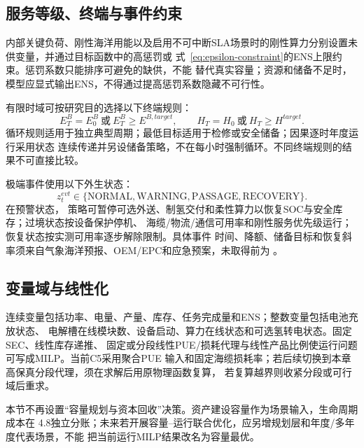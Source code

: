 \subsection{服务等级、终端与事件约束}

内部关键负荷、刚性海洋用能以及启用不可中断SLA场景时的刚性算力分别设置未供变量，并通过目标函数中的高惩罚或
式~\eqref{eq:epsilon-constraint}的ENS上限约束。惩罚系数只能排序可避免的缺供，不能
替代真实容量；资源和储备不足时，模型应显式输出ENS，不得通过提高惩罚系数隐藏不可行性。

有限时域可按研究目的选择以下终端规则：
\begin{equation}
E_T^B=E_0^B\ \text{或}\ E_T^B\ge E^{B,target},\qquad
H_T=H_0\ \text{或}\ H_T\ge H^{target}.
\label{eq:terminal-rules}
\end{equation}
循环规则适用于独立典型周期；最低目标适用于检修或安全储备；因果逐时年度运行采用状态
连续传递并另设储备策略，不在每小时强制循环。不同终端规则的结果不可直接比较。

极端事件使用以下外生状态：
\begin{equation}
z_t^{evt}\in\{\mathrm{NORMAL},\mathrm{WARNING},
\mathrm{PASSAGE},\mathrm{RECOVERY}\}.
\label{eq:event-state}
\end{equation}
在预警状态，
策略可暂停可选外送、制氢交付和柔性算力以恢复SOC与安全库存；过境状态按设备保护停机、
海缆/物流/通信可用率和刚性服务优先级运行；恢复状态按实测可用率逐步解除限制。具体事件
时间、降额、储备目标和恢复斜率须来自气象海洋预报、OEM/EPC和应急预案，未取得前为
\assumptiontag。

\subsection{变量域与线性化}

连续变量包括功率、电量、产量、库存、任务完成量和ENS；整数变量包括电池充放状态、
电解槽在线模块数、设备启动、算力在线状态和可选氢转电状态。固定SEC、线性库存递推、
固定或分段线性PUE/损耗代理与线性产品比例使运行问题可写成MILP。当前C5采用聚合PUE
输入和固定海缆损耗率；若后续切换到本章高保真分段代理，须在求解后用原物理函数复算，
若复算越界则收紧分段或可行域后重求。

本节不再设置“容量规划与资本回收”决策。资产建设容量作为场景输入，生命周期成本在
4.8独立分账；未来若开展容量--运行联合优化，应另增规划层和年度/多年度代表场景，不能
把当前运行MILP结果改名为容量最优。

